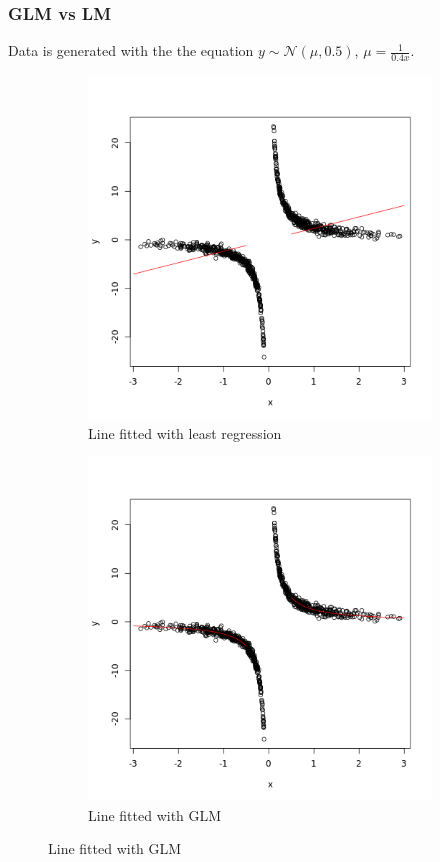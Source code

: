 \begin{frame}
\frametitle{GLM vs LM}
Data is generated with the the equation $y\sim \mathcal{N}(\mu, 0.5)$, $\mu=\frac{1}{0.4x}$.
\begin{figure}
\centering
\begin{subfigure}{.5\textwidth}
  \centering
  \includegraphics[height=.5\textheight]{glm/Unknown-2}
  \caption{Line fitted with least regression}
  \label{fig:sub1}
\end{subfigure}%
\begin{subfigure}{.5\textwidth}
  \centering
  \includegraphics[height=.5\textheight]{glm/Unknown3}
  \caption{Line fitted with GLM}
  \label{fig:sub2}
\end{subfigure}
\label{fig:test}
\end{figure}
\end{frame}


